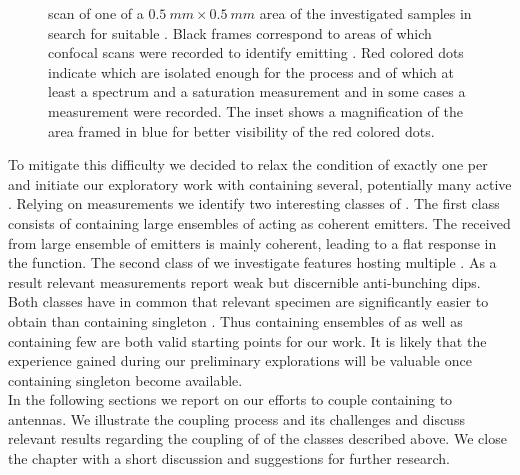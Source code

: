 		\begin{figure}[htbp]
			\centering
			\caption[LSM scan, overview of a $\SI{0.5}{mm}\times\SI{0.5}{mm}$ area]{\Lsm scan of one of a $\SI{0.5}{mm}\times\SI{0.5}{mm}$ area of the investigated samples in search for suitable \nds. Black frames correspond to areas of which confocal scans were recorded to identify \nds emitting \fl. Red colored dots indicate \nds which are isolated enough for the \pp process and of which at least a \pl spectrum and a saturation measurement and in some cases a \gt measurement were recorded. The inset shows a magnification of the area framed in blue for better visibility of the red colored dots.}
			\label{fig::milky_way2}
		\end{figure}

		To mitigate this difficulty we decided to relax the condition of exactly one \siv per \nd and initiate our exploratory work with \nds containing several, potentially many active \sivs.
		Relying on \gt measurements we identify two interesting classes of \nds.
		The first class consists of \nds containing large ensembles of \sivs acting as coherent emitters.
		The \fl received from large ensemble of emitters is mainly coherent, leading to a flat response in the \gtz function.
		The second class of \nds we investigate features \nds hosting multiple \sivs.
		As a result relevant \gtz measurements report weak but discernible anti-bunching dips.
		Both classes have in common that relevant \nd specimen are significantly easier to obtain than \nds containing singleton \sivs.
		Thus \nds containing ensembles of \sivs as well as \nds containing few \sivs are both valid starting points for our work.
		It is likely that the experience gained during our preliminary explorations will be valuable once \nds containing singleton \sivs become available.
		\\
		In the following sections we report on our efforts to couple \nds containing \sivs to antennas. We illustrate the coupling process and its challenges and discuss relevant results regarding the coupling of \nds of the classes described above. We close the chapter with a short discussion and suggestions for further research.

